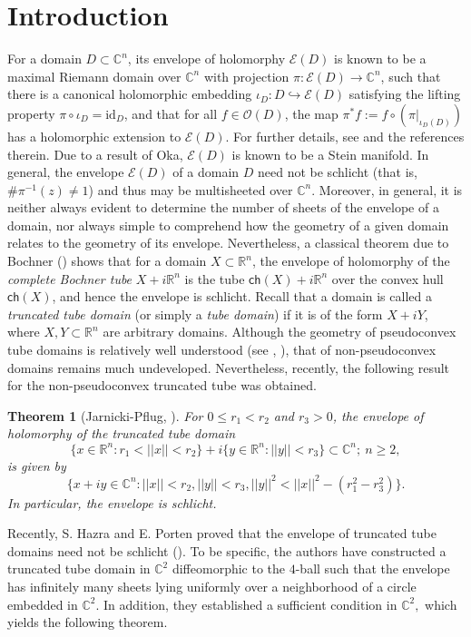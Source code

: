 \documentclass[12pt,reqno, a4paper]{amsart}
\newtheorem{theorem}{Theorem}[section]
\theoremstyle{definition}
\theoremstyle{definition}
\numberwithin{equation}{section}
\def\R{\mathbb{R}}                              %
\def\C{\mathbb{C}}                              %
\begin{document}
\section{Introduction}\label{sec_1}
For a domain $D\subset \C^n$, its envelope of holomorphy $\mathcal{E}(D)$ is known to be a {maximal} Riemann domain over $\C^n$ with projection $\pi : \mathcal{E}(D) \to \C^n$, such that there is a canonical holomorphic embedding $\iota_D:D\hookrightarrow \mathcal{E}(D)$ satisfying the lifting property $\pi\circ\iota_D=\mbox{id}_D$, and that for all $f \in \mathcal{O}(D)$, the map $\pi^* f:=f\circ(\pi|_{\iota_D(D)})$ has a holomorphic extension to $\mathcal{E}(D)$. For further details, see \cite{JP1} and the references therein. Due to a result of Oka, $\mathcal{E}(D)$ is known to be a Stein manifold. In general, the envelope $\mathcal{E}(D)$ of a domain $D$ need not be schlicht (that is, $\#\pi^{-1}(z)\neq 1$) and thus may be multisheeted over $\C^n$. Moreover, in general, it is neither always evident to determine the number of sheets of the envelope of a domain, nor always simple to comprehend how the geometry of a given domain relates to the geometry of its envelope. Nevertheless, a classical theorem due to Bochner (\cite{boch}) shows that for a domain $X\subset \R^n$, the envelope of holomorphy of the \textit{complete Bochner tube} $X+i\R^n$ is the tube $  \textsf{ch}(X) + i\R^n$ over the convex hull $\textsf{ch}(X)$, and hence the envelope is schlicht. Recall that a domain is called a \textit{truncated tube domain} (or simply a \textit{tube domain}) if it is of the form $X+iY$, where $X, Y \subset \mathbb{R}^n$ are arbitrary domains. Although the geometry of pseudoconvex tube domains is relatively well understood (see  \cite{nogu}, \cite{egm}), that of non-pseudoconvex domains remains much undeveloped. Nevertheless, recently, the following result for the non-pseudoconvex truncated tube was obtained.

\begin{theorem}[Jarnicki-Pflug, \cite{JP2}]\label{JP2theorem}
For $0\leq r_1 < r_2$ and $r_3>0$, the envelope of holomorphy of the truncated tube domain $$\{x \in \R^n: r_1<||x||<r_2\}+i\{y \in \R^n:||y||<r_3\} \subset \C^n; ~ n\geq 2,$$ is given by $$\{x+iy\in \C^n: ||x||<r_2, ||y||<r_3,  ||y||^2<||x||^2-(r_1^2-r_3^2)\}.$$ In particular, the envelope is schlicht.
\end{theorem}

Recently, S. Hazra and E. Porten proved that the envelope of truncated tube domains need not be schlicht (\cite{haz-por}). To be specific, the authors have constructed a truncated tube domain in $\C^2$ diffeomorphic to the $4$-ball such that the envelope has infinitely many sheets lying uniformly over
a neighborhood of a circle embedded in $\C^2$. In addition, they established a sufficient condition in 
$\C^2,$ which yields the following theorem.
\end{document}
